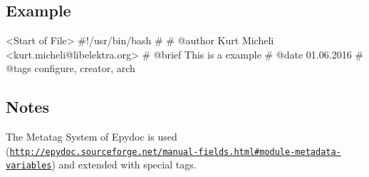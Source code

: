\subsection*{Example}

\begin{DoxyVerb}        <Start of File>
        #!/usr/bin/bash
        #
        # @author Kurt Micheli <kurt.micheli@libelektra.org>
        # @brief This is a example
        # @date 01.06.2016
        # @tags configure, creator, arch\end{DoxyVerb}


\subsection*{Notes}

The Metatag System of Epydoc is used (\href{http://epydoc.sourceforge.net/manual-fields.html#module-metadata-variables}{\tt http\+://epydoc.\+sourceforge.\+net/manual-\/fields.\+html\#module-\/metadata-\/variables}) and extended with special tags. 